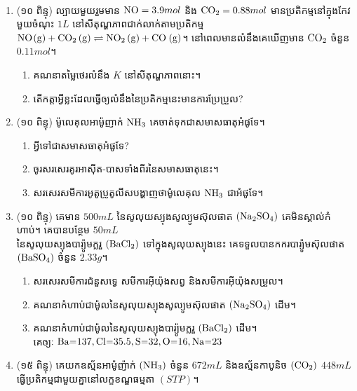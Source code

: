 \documentclass{officialexam}
\begin{document}
{\maketitle}\\
\begin{enumerate}[m]
	\item {\color{khtug}\kml (១០ ពិន្ទុ)} ល្បាយមួយរួមមាន $\ce{NO}=3.9mol$ និង $\ce{CO2}=0.88mol$ មានប្រតិកម្មនៅក្នុងកែវមួយចំណុះ $1L$ នៅសីតុណ្ហភាពជាក់លាក់តាមប្រតិកម្ម $\ce{NO(g) + CO2 (g)}\rightleftharpoons \ce{NO2 (g) + CO (g)}$។ នៅពេលមានលំនឹងគេឃើញមាន $\ce{CO2}$ ចំនួន $0.11mol$។
	\begin{enumerate}[k]
		\item គណនាតម្លៃថេរលំនឹង $K$ នៅសីតុណ្ហភាពនោះ។
		\item តើកត្តាអ្វីខ្លះដែលធ្វើឲ្យលំនឹងនៃប្រតិកម្មនេះមានការប្រែប្រួល?
	\end{enumerate}
	\item {\color{khtug}\kml (១០ ពិន្ទុ)} ម៉ូលេគុលអាម៉ូញាក់ $\ce{NH3}$ គេចាត់ទុកជាសមាសធាតុអំផូទែ។
	\begin{enumerate}[k]
		\item អ្វីទៅជាសមាសធាតុអំផូទែ?
		\item ចូរសរសេរគូរអាសុីត-បាសទាំងពីរនៃសមាសធាតុនេះ។
		\item សរសេរសមីការអូតូប្រូតូលីសបង្ហាញថាម៉ូលេគុល $\ce{NH3}$ ជាអំផូទែ។
	\end{enumerate}
	\item {\color{khtug}\kml (១០ ពិន្ទុ)} គេមាន $500mL$ នៃសូលុយស្យុង​សូល្យូមស៊ុលផាត $\left(\ce{Na2SO4}\right)$ គេមិនស្គាល់កំហាប់។ គេបានបន្ថែម $50mL$ \\នៃសូលុយស្យុងបារ្យ៉ូមក្លរួ $\left(\ce{BaCl2}\right)$ ទៅក្នុងសូលុយស្យុងនេះ គេទទួលបានកករបារ្យ៉ូមស៊ុលផាត $\left(\ce{BaSO4}\right)$ ចំនួន $2.33g$។
	\begin{enumerate}[k]
		\item សរសេរសមីការជំនួសទ្វេ សមីការអុីយ៉ុងសព្វ និងសមីការអុីយ៉ុងសម្រួល។
		\item គណនាកំហាប់ជាម៉ូលនៃសូលុយស្យុងសូល្យូមស៊ុលផាត $\left(\ce{Na2SO4}\right)$ ដើម។
		\item គណនាកំហាប់ជាម៉ូលនៃសូលុយស្យុងបារ្យ៉ូមក្លរួ $\left(\ce{BaCl2}\right)$ ដើម។\\
		គេឲ្យៈ $\ce{Ba=137}, \ce{ Cl=35.5}, \ce{S=32}, \ce{O=16}, \ce{Na=23}$
	\end{enumerate}
	\item {\color{khtug}\kml (១៥ ពិន្ទុ)} គេយកឧស្ម័នអាម៉ូញ៉ាក់ $\left(\ce{NH3}\right)$ ចំនួន $672mL$ និងឧស្ម័នកាបូនិច $\left(\ce{CO2}\right)$ $448mL$\\ ធ្វើប្រតិកម្មជាមួយគ្នានៅលក្ខខណ្ឌធម្មតា $\left(STP\right)$។

\end{enumerate}
\end{document}
